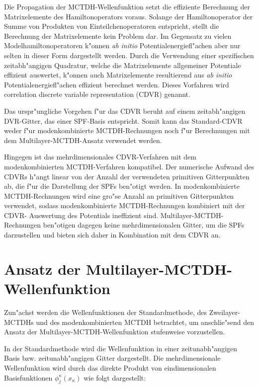Die Propagation der MCTDH-Wellenfunktion setzt die effiziente Berechnung der Matrixelemente des Hamiltonoperators voraus.
Solange der Hamiltonoperator der Summe von Produkten von Einteilchenoperatoren \cite{MMC1} entspricht, stellt die Berechnung der Matrixelemente kein Problem dar.
Im Gegensatz zu vielen Modelhamiltonoperatoren k"onnen \textit{ab initio} Potentialenergiefl"achen aber nur selten in dieser Form dargestellt werden.
Durch die Verwendung einer spezifischen zeitabh"angigen Quadratur, welche die Matrixelemente allgemeiner Potentiale effizient auswertet, k"onnen
auch Matrixelemente resultierend aus \textit{ab initio} Potentialenergiefl"achen effizient berechnet werden.
Dieses Vorfahren wird correlation discrete variable representation (CDVR) \cite{M3, vHM2} genannt.

Das urspr"ungliche Vorgehen f"ur das CDVR \cite{M3} beruht auf einem zeitabh"angigen DVR-Gitter, das einer SPF-Basis entspricht.
Somit kann das Standard-CDVR weder f"ur modenkombinierte MCTDH-Rechnungen noch f"ur Berechnungen mit dem Multilayer-MCTDH-Ansatz verwendet werden.

Hingegen ist das mehrdimensionales CDVR-Verfahren mit dem modenkombinierten MCTDH-Verfahren kompatibel. \cite{vHM3}
Der numerische Aufwand des CDVRs h"angt linear von der Anzahl der verwendeten primitiven Gitterpunkten ab, die f"ur die Darstellung der SPFs ben"otigt werden.
In modenkombinierte MCTDH-Rechnungen wird eine gro"se Anzahl an primitiven Gitterpunkten verwendet, sodass modenkombinierte MCTDH-Rechnungen kombiniert mit der CDVR-
Auswertung des Potentials ineffizient sind. Multilayer-MCTDH-Rechnungen ben"otigen dagegen keine mehrdimensionalen Gitter, um die SPFs darzustellen und bieten sich
daher in Kombination mit dem CDVR an.


\section{Ansatz der Multilayer-MCTDH-Wellenfunktion}
Zun"achst  werden die Wellenfunktionen der Standardmethode, des Zweilayer-MCTDHs und des moden\-kombi\-nierten MCTDH betrachtet,
 um anschlie"send den Ansatz der Multilayer-MCTDH-Wellenfunktion
stufenweise vorzustellen.

In der Standardmethode wird die Wellenfunktion in einer zeitunabh"angigen Basis bzw. zeitunabh"angigen Gitter dargestellt.
Die mehrdimensionale Wellenfunktion wird durch das direkte Produkt von eindimensionalen Basisfunktionen $\phi^{\kappa}_{j}(x_{\kappa})$ wie folgt 
dargestellt:


